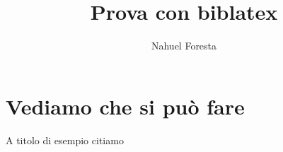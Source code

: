 \documentclass[a4paper,10pt]{article}
\title{Prova con biblatex}
\author{Nahuel Foresta}
\begin{document}
\maketitle

\newpage

\section{Vediamo che si può fare}
A titolo di esempio citiamo \cite{Nahuel19}

\vspace{5cm}

\printbibliography
\end{document}
